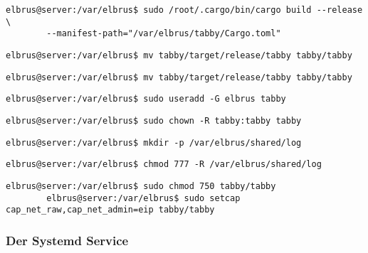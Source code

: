 	\lstset{style=commands}	
	\begin{lstlisting}[caption={Kompilieren der Kernsoftware.}]
		elbrus@server:/var/elbrus$ sudo /root/.cargo/bin/cargo build --release \
		--manifest-path="/var/elbrus/tabby/Cargo.toml"
	\end{lstlisting}
	
	\lstset{style=commands}
	\begin{lstlisting}[caption={Verschieben der kompilierten Software.}]
		elbrus@server:/var/elbrus$ mv tabby/target/release/tabby tabby/tabby
	\end{lstlisting}

	\lstset{style=commands}
	\begin{lstlisting}[caption={Verschieben der kompilierten Software.}]
		elbrus@server:/var/elbrus$ mv tabby/target/release/tabby tabby/tabby
	\end{lstlisting}

	\lstset{style=commands}
	\begin{lstlisting}[caption={Anlegen des Benutzers 'tabby'.}]
		elbrus@server:/var/elbrus$ sudo useradd -G elbrus tabby
	\end{lstlisting}

	\lstset{style=commands}
	\begin{lstlisting}[caption={Verändern der berechtigungen auf Ordner 'tabby'.}]
		elbrus@server:/var/elbrus$ sudo chown -R tabby:tabby tabby
	\end{lstlisting}
	\newpage

	\lstset{style=commands}
	\begin{lstlisting}[caption={Anlegen des Log-Verzeichnisses.}]
		elbrus@server:/var/elbrus$ mkdir -p /var/elbrus/shared/log
	\end{lstlisting}

	\lstset{style=commands}
	\begin{lstlisting}[caption={Verändern der Berechtigung das Log-Verzeichnisses.}]
		elbrus@server:/var/elbrus$ chmod 777 -R /var/elbrus/shared/log
	\end{lstlisting}

	\lstset{style=commands}
	\begin{lstlisting}[caption={Verändern der Berechtigung der kompilierten Software.}]
		elbrus@server:/var/elbrus$ sudo chmod 750 tabby/tabby
		elbrus@server:/var/elbrus$ sudo setcap cap_net_raw,cap_net_admin=eip tabby/tabby
	\end{lstlisting}

	\subsubsection[systemd service]{Der Systemd Service}
	
